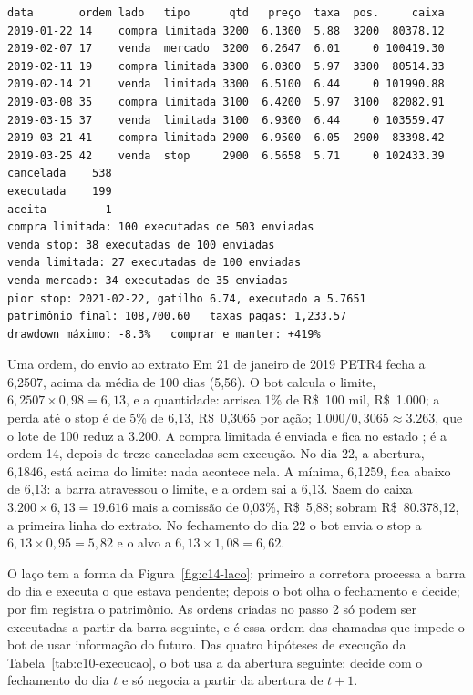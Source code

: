 
\begin{lstlisting}[style=saida]
data       ordem lado   tipo      qtd   preço  taxa  pos.     caixa
2019-01-22 14    compra limitada 3200  6.1300  5.88  3200  80378.12
2019-02-07 17    venda  mercado  3200  6.2647  6.01     0 100419.30
2019-02-11 19    compra limitada 3300  6.0300  5.97  3300  80514.33
2019-02-14 21    venda  limitada 3300  6.5100  6.44     0 101990.88
2019-03-08 35    compra limitada 3100  6.4200  5.97  3100  82082.91
2019-03-15 37    venda  limitada 3100  6.9300  6.44     0 103559.47
2019-03-21 41    compra limitada 2900  6.9500  6.05  2900  83398.42
2019-03-25 42    venda  stop     2900  6.5658  5.71     0 102433.39
cancelada    538
executada    199
aceita         1
compra limitada: 100 executadas de 503 enviadas
venda stop: 38 executadas de 100 enviadas
venda limitada: 27 executadas de 100 enviadas
venda mercado: 34 executadas de 35 enviadas
pior stop: 2021-02-22, gatilho 6.74, executado a 5.7651
patrimônio final: 108,700.60   taxas pagas: 1,233.57
drawdown máximo: -8.3%   comprar e manter: +419%
\end{lstlisting}

\begin{exemplo}{Uma ordem, do envio ao extrato}
Em 21 de janeiro de 2019 PETR4 fecha a 6,2507, acima da média de 100 dias (5,56). O bot calcula o limite, $6,2507 \times 0,98 = 6,13$, e a quantidade: arrisca 1\% de R\$~100 mil, R\$~1.000; a perda até o stop é de 5\% de 6,13, R\$~0,3065 por ação; $1.000 / 0,3065 \approx 3.263$, que o lote de 100 reduz a 3.200. A compra limitada é enviada e fica no estado ; é a ordem 14, depois de treze canceladas sem execução. No dia 22, a abertura, 6,1846, está acima do limite: nada acontece nela. A mínima, 6,1259, fica abaixo de 6,13: a barra atravessou o limite, e a ordem sai a 6,13. Saem do caixa $3.200 \times 6,13 = 19.616$ mais a comissão de 0,03\%, R\$~5,88; sobram R\$~80.378,12, a primeira linha do extrato. No fechamento do dia 22 o bot envia o stop a $6,13 \times 0,95 = 5,82$ e o alvo a $6,13 \times 1,08 = 6,62$.
\end{exemplo}

O laço tem a forma da Figura~\ref{fig:c14-laco}: primeiro a corretora processa a barra do dia e executa o que estava pendente; depois o bot olha o fechamento e decide; por fim registra o patrimônio. As ordens criadas no passo 2 só podem ser executadas a partir da barra seguinte, e é essa ordem das chamadas que impede o bot de usar informação do futuro. Das quatro hipóteses de execução da Tabela~\ref{tab:c10-execucao}, o bot usa a da abertura seguinte: decide com o fechamento do dia $t$ e só negocia a partir da abertura de $t+1$.

